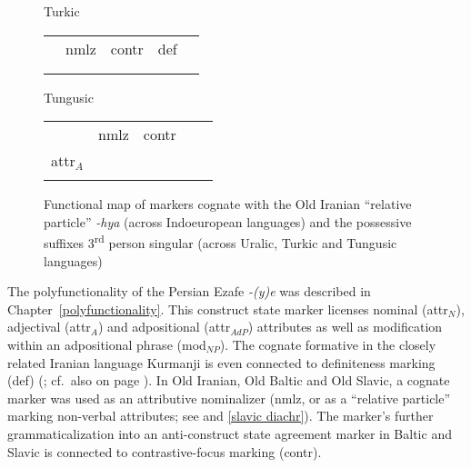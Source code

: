 {\begin{figure}[htbp]
\parbox[b]{0.5\textwidth}{
\begin{center}{\sc Turkic}\\
\medskip
\begin{tabular}{| c || c | c | c | c}
\cline{1-1}
\\
\cline{1-1}
\\
\hline
 & {\sc nmlz} & {\sc contr} & {\sc def}\\
\hline
\\
\cline{1-1}
\\
\cline{1-1}
\end{tabular}
\end{center}
}
\parbox[b]{0.5\textwidth}{
\begin{center}{\sc Tungusic}\\
\medskip
\begin{tabular}{| c || c | c | c | c}
\cline{1-1}
\\
\cline{1-1}
\\
\hline
 & {\sc nmlz} & {\sc contr} & \\
\hline
{\sc attr}$_{A}$\\
\cline{1-1}
\\
\cline{1-1}
\end{tabular}
\end{center}
}
\caption[Functional map of cognate devices]{Functional map of markers cognate with the Old Iranian “relative particle” \textit{-hya} (across Indoeuropean languages) and the possessive suffixes 3\textsuperscript{rd} person singular (across Uralic, Turkic and Tungusic languages)}
\label{ie-ural funcmap}
\end{figure}
The polyfunctionality of the Persian Ezafe \textit{-(y)e} was described in Chapter~\ref{polyfunctionality}. This construct state marker licenses nominal ({\sc attr}$_{N}$), adjectival ({\sc attr}$_{A}$) and adpositional ({\sc attr}$_{AdP}$) attributes as well as modification within an adpositional phrase ({\sc mod}$_{NP}$). The cognate formative in the closely related Iranian language Kurmanji is even connected to definiteness marking ({\sc def}) (\citealt{schroder2002}; cf.~also  on page \pageref{ez kirmanji paradigm}). In Old Iranian, Old Baltic and Old Slavic, a cognate marker was used as an attributive nominalizer ({\sc nmlz}, or as a “relative particle” marking non-verbal attributes; see  and \ref{slavic diachr}). The marker's further grammaticalization into an anti-construct state agreement marker in Baltic and Slavic is connected to contrastive-focus marking ({\sc contr}).

}
